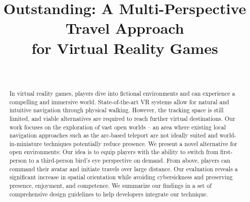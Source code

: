 \documentclass{sigchi}
\newcommand{\comm}[1]{}
\def\plaintitle{Outstanding: A Multi-Perspective Travel Approach\\ for Virtual Reality Games}
\begin{document}
\title{\plaintitle}
\comm{
\numberofauthors{3}
\author{%
  \alignauthor{d\\
    \affaddr{c}\\
    \affaddr{b}\\
    \email{a}}\\
\alignauthor{d\\
    \affaddr{c}\\
    \affaddr{b}\\
    \email{a}}\\
\alignauthor{d\\
    \affaddr{c}\\
    \affaddr{b}\\
    \email{a}}\\
}}
\author{%
  \\
}


\maketitle

\begin{abstract}
In virtual reality games, players dive into fictional environments and can experience a compelling and immersive world. State-of-the-art VR systems allow for natural and intuitive navigation through physical walking. However, the tracking space is still limited, and viable alternatives \comm{or extensions }are required to reach further virtual destinations. Our work focuses on the exploration of vast open worlds -- an area where existing local navigation approaches such as the arc-based teleport are not ideally suited and world-in-miniature techniques potentially reduce presence. We present a novel alternative for open environments: Our idea is to equip players with the ability to switch from first-person to a third-person bird's eye perspective on demand. From above, players can command their avatar and initiate travels over large distance. Our evaluation reveals a significant increase in spatial orientation while avoiding cybersickness and preserving presence, enjoyment, and competence. We summarize our findings in a set of comprehensive design guidelines to help developers integrate our technique.
\end{abstract}
\end{document}
